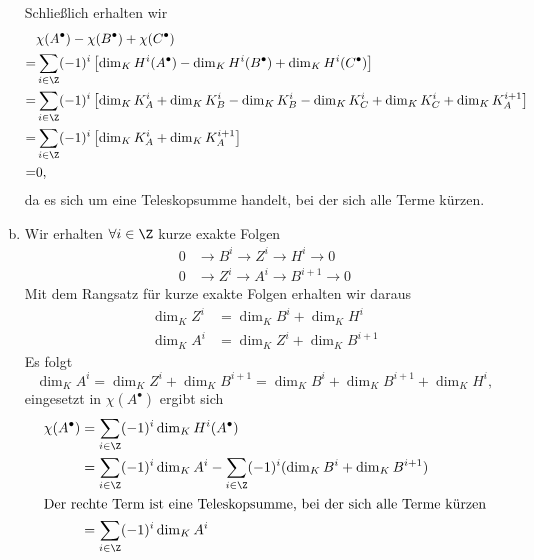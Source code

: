 \documentclass{article}
\begin{document}
\begin{enumerate}[(a)]
          Schließlich erhalten wir
          \begin{align*}
                & \chi(A^\bullet) -\chi(B^\bullet) + \chi(C^\bullet)                                                                               \\
              = & \sum_{i \in \Z} (-1)^i \left[ \dim_K H^i(A^\bullet) - \dim_K H^i(B^\bullet) + \dim_K H^i(C^\bullet) \right]                      \\
              = & \sum_{i \in \Z} (-1)^i \left[ \dim_K K_A^i + \dim_K K_B^i - \dim_K K_B^i - \dim_K K_C^i +\dim_K K_C^i + \dim_K K_A^{i+1} \right] \\
              = & \sum_{i \in \Z} (-1)^i \left[ \dim_K K_A^i + \dim_K K_A^{i+1} \right]                                                            \\
              = & 0,
          \end{align*}
          da es sich um eine Teleskopsumme handelt, bei der sich alle Terme kürzen.
    \item Wir erhalten $\forall i \in \Z$ kurze exakte Folgen
          \begin{align*}
              0 & \to B^i \to Z^i \to H^i \to 0     \\
              0 & \to Z^i \to A^i \to B^{i+1} \to 0
          \end{align*}
          Mit dem Rangsatz für kurze exakte Folgen erhalten wir daraus
          \begin{align*}
              \dim_K Z^i & = \dim_K B^i + \dim_K H^i     \\
              \dim_K A^i & = \dim_K Z^i + \dim_K B^{i+1}
          \end{align*}
          Es folgt
          \[
              \dim_K A^i = \dim_K Z^i + \dim_K B^{i+1} = \dim_K B^i + \dim_K B^{i+1} + \dim_K H^i,
          \]
          eingesetzt in $\chi(A^\bullet)$ ergibt sich
          \begin{align*}
              \chi(A^\bullet) & = \sum_{i \in \Z} (-1)^i \dim_K H^i(A^\bullet)                                            \\
                              & = \sum_{i \in \Z} (-1)^i \dim_K A^i - \sum_{i\in \Z} (-1)^i (\dim_K B^i + \dim_K B^{i+1}) \\
              \intertext{Der rechte Term ist eine Teleskopsumme, bei der sich alle Terme kürzen}
                              & = \sum_{i \in \Z} (-1)^i \dim_K A^i
          \end{align*}
\end{enumerate}
\end{document}
